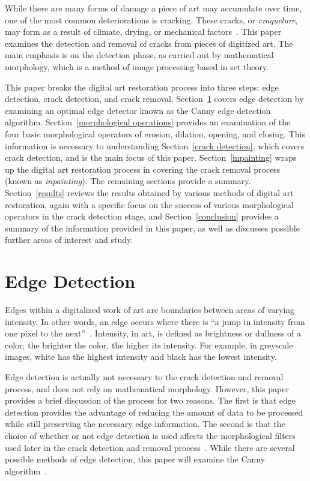 \documentclass{sig-alternate}
\begin{document}
While there are many forms of damage a piece of art may accumulate over time, one of the most common deteriorations is cracking. These cracks, or \textit{craquelure}, may form as a result of climate, drying, or mechanical factors~\cite{Altarpiece:2013, Statistics:2013, TopHat:2010}. This paper examines the detection and removal of cracks from pieces of digitized art. The main emphasis is on the detection phase, as carried out by mathematical morphology, which is a method of image processing based in set theory.

This paper breaks the digital art restoration process into three steps: edge detection, crack detection, and crack removal. Section~\ref{edge detection} covers edge detection by examining an optimal edge detector known as the Canny edge detection algorithm. Section~\ref{morphological operations} provides an examination of the four basic morphological operators of erosion, dilation, opening, and closing. This information is necessary to understanding Section~\ref{crack detection}, which covers crack detection, and is the main focus of this paper. Section~\ref{inpainting} wraps up the digital art restoration process in covering the crack removal process (known as \textit{inpainting}). The remaining sections provide a summary. Section~\ref{results} reviews the results obtained by various methods of digital art restoration, again with a specific focus on the success of various morphological operators in the crack detection stage, and Section~\ref{conclusion} provides a summary of the information provided in this paper, as well as discusses possible further areas of interest and study.

\section{Edge Detection}\label{edge detection}
Edges within a digitalized work of art are boundaries between areas of varying intensity. In other words, an edge occurs where there is ``a jump in intensity from one pixel to the next''~\cite{CannySummarized}. Intensity, in art, is defined as brightness or dullness of a color; the brighter the color, the higher its intensity. For example, in greyscale images, white has the highest intensity and black has the lowest intensity.

Edge detection is actually not necessary to the crack detection and removal process, and does not rely on mathematical morphology. However, this paper provides a brief discussion of the process for two reasons. The first is that edge detection provides the advantage of reducing the amount of data to be processed while still preserving the necessary edge information. The second is that the choice of whether or not edge detection is used affects the morphological filters used later in the crack detection and removal process~\cite{CannySummarized}. While there are several possible methods of edge detection, this paper will examine the Canny algorithm~\cite{Canny:1986, CannySummarized}.
\end{document}

